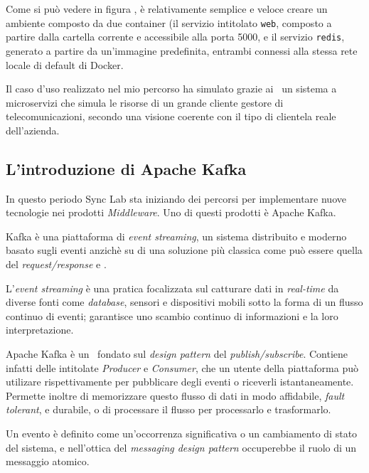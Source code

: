 Come si può vedere in figura \thefigure, è relativamente semplice e veloce creare un ambiente composto da due container (il servizio intitolato \texttt{web}, composto a partire dalla cartella corrente e accessibile alla porta 5000, e il servizio \texttt{redis}, generato a partire da un'immagine predefinita, entrambi connessi alla stessa rete locale di default di Docker.

Il caso d'uso realizzato nel mio percorso ha simulato grazie ai \container\ un sistema a microservizi che simula le risorse di un grande cliente gestore di telecomunicazioni, secondo una visione coerente con il tipo di clientela reale dell'azienda.

\subsection{L'introduzione di Apache Kafka}

In questo periodo Sync Lab sta iniziando dei percorsi per implementare nuove tecnologie nei prodotti \textit{Middleware}.
Uno di questi prodotti è Apache Kafka.

Kafka è una piattaforma di \textit{event streaming}, un sistema distribuito e moderno basato sugli eventi anzichè su di una soluzione più classica come può essere quella del \textit{request/response} e .

L'\textit{event streaming} è una pratica focalizzata sul catturare dati in \textit{real-time} da diverse fonti come \textit{database}, sensori e dispositivi mobili sotto la forma di un flusso continuo di eventi; garantisce uno scambio continuo di informazioni e la loro interpretazione.

Apache Kafka è un \software\ fondato sul \textit{design pattern} del \textit{publish/subscribe}.
Contiene infatti delle  intitolate \textit{Producer} e \textit{Consumer}, che un utente della piattaforma può utilizare rispettivamente per pubblicare degli eventi o riceverli istantaneamente.
Permette inoltre di memorizzare questo flusso di dati in modo affidabile, \textit{fault tolerant}, e durabile, o di processare il flusso per processarlo e trasformarlo.

Un evento è definito come un'occorrenza significativa o un cambiamento di stato del sistema, e nell'ottica del \textit{messaging design pattern} occuperebbe il ruolo di un messaggio atomico.

